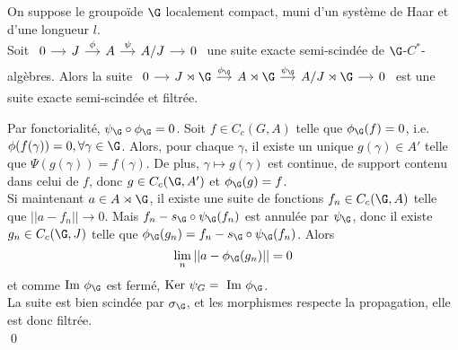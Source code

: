 \begin{lem} On suppose le groupoïde $\G$ localement compact, muni d'un système de Haar et d'une longueur $l$.\\
Soit 
$\begin{tikzcd}[column sep = small]
0 \arrow{r} & J\arrow{r}{\phi}& A \arrow{r}{\psi} & A/J \arrow{r} & 0
\end{tikzcd}$ une suite exacte semi-scindée de $\G$-$C^*$-algèbres. Alors la suite 
$\begin{tikzcd}[column sep = small]
0 \arrow{r} & J\rtimes \G\arrow{r}{\phi_\G}& A\rtimes \G \arrow{r}{\psi_\G} & A/J\rtimes \G \arrow{r} & 0
\end{tikzcd}$ est une suite exacte semi-scindée et filtrée.
\end{lem}

\begin{dem}
Par fonctorialité, $\psi_\G \circ \phi_\G = 0$. Soit $f\in C_c(G,A)$ telle que $\phi_\G(f)=0$, i.e. $\phi(f(\gamma))=0,\forall \gamma\in \G$. Alors, pour chaque $\gamma$, il existe un unique $g(\gamma)\in A'$ telle que $\Psi(g(\gamma))=f(\gamma)$. De plus, $\gamma \mapsto g(\gamma)$ est continue, de support contenu dans celui de $f$, donc $g\in C_c(\G,A')$ et $\phi_\G(g)=f$.\\

Si maintenant $a\in A\rtimes \G$, il existe une suite de fonctions $f_n\in C_c(\G, A)$ telle que $||a-f_n||\rightarrow 0$. Mais $f_n-s_\G\circ \psi_\G (f_n)$ est annulée par $\psi_\G$, donc il existe $g_n\in  C_c(\G,J)$ telle que $\phi_\G(g_n)=f_n-s_\G\circ \psi_\G (f_n)$. Alors 
\[\lim_{n}||a-\phi_\G(g_n)||=0\]
et comme $\text{Im }\phi_ \G $ est fermé, $\text{Ker }\psi_G = \text{ Im } \phi_\G$.\\
La suite est bien scindée par $\sigma_\G$, et les morphismes respecte la propagation, elle est donc filtrée.\\
\qed
\end{dem}

